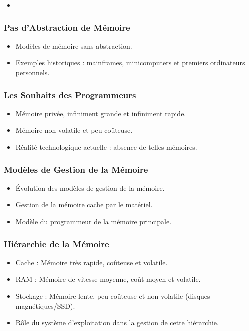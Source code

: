 \documentclass{beamer}
\begin{document}
\begin{itemize}
    \item 
\end{itemize}

\begin{frame}
\frametitle{Pas d'Abstraction de Mémoire}
\begin{itemize}
    \item Modèles de mémoire sans abstraction.
    \item Exemples historiques : mainframes, minicomputers et premiers ordinateurs personnels.
\end{itemize}
\end{frame}

\begin{frame}
\frametitle{Les Souhaits des Programmeurs}
\begin{itemize}
    \item Mémoire privée, infiniment grande et infiniment rapide.
    \item Mémoire non volatile et peu coûteuse.
    \item Réalité technologique actuelle : absence de telles mémoires.
\end{itemize}
\end{frame}

\begin{frame}
\frametitle{Modèles de Gestion de la Mémoire}
\begin{itemize}
    \item Évolution des modèles de gestion de la mémoire.
    \item Gestion de la mémoire cache par le matériel.
    \item Modèle du programmeur de la mémoire principale.
\end{itemize}
\end{frame}

\begin{frame}
\frametitle{Hiérarchie de la Mémoire}
\begin{itemize}
    \item Cache : Mémoire très rapide, coûteuse et volatile.
    \item RAM : Mémoire de vitesse moyenne, coût moyen et volatile.
    \item Stockage : Mémoire lente, peu coûteuse et non volatile (disques magnétiques/SSD).
    \item Rôle du système d'exploitation dans la gestion de cette hiérarchie.
\end{itemize}
\end{frame}
\end{document}
